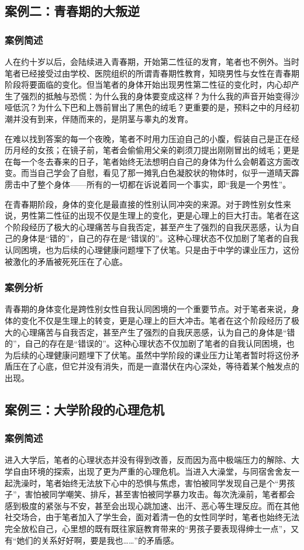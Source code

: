 \documentclass[twocolumn]{ctexart}
\begin{document}
\subsection {案例二：青春期的大叛逆}
\subsubsection{案例简述}
人在约十岁以后，会陆续进入青春期，开始第二性征的发育，笔者也不例外。当时笔者已经接受过由学校、医院组织的所谓青春期性教育，知晓男性与女性在青春期阶段将要面临的变化。但当笔者的身体开始出现男性第二性征的变化时，内心却产生了强烈的抵触与恐慌：为什么我的身体要变成这样？为什么我的声音开始变得沙哑低沉？为什么下巴和上唇前冒出了黑色的绒毛？更重要的是，预料之中的月经初潮并没有到来，伴随而来的，是阴茎与睾丸的发育。

在难以找到答案的每一个夜晚，笔者不时用力压迫自己的小腹，假装自己是正在经历月经的女孩；在镜子前，笔者会偷偷用父亲的剃须刀提出刚刚冒出的绒毛；更是在每一个冬去春来的日子，笔者始终无法想明白自己的身体为什么会朝着这方面改变。而当自己学会了自慰，看见了那一摊乳白色凝胶状的物体时，似乎一道晴天霹雳击中了整个身体——所有的一切都在诉说着同一个事实，即“我是一个男性”。

在青春期阶段，身体的变化是最直接的性别认同冲突的来源。对于跨性别女性来说，男性第二性征的出现不仅是生理上的变化，更是心理上的巨大打击。笔者在这个阶段经历了极大的心理痛苦与自我否定，甚至产生了强烈的自我厌恶感，认为自己的身体是“错的”，自己的存在是“错误的”。这种心理状态不仅加剧了笔者的自我认同困境，也为后续的心理健康问题埋下了伏笔。只是由于中学的课业压力，这份被激化的矛盾被死死压在了心底。

\subsubsection{案例分析}
青春期的身体变化是跨性别女性自我认同困境的一个重要节点。对于笔者来说，身体的变化不仅是生理上的转变，更是心理上的巨大冲击。笔者在这个阶段经历了极大的心理痛苦与自我否定，甚至产生了强烈的自我厌恶感，认为自己的身体是“错的”，自己的存在是“错误的”。这种心理状态不仅加剧了笔者的自我认同困境，也为后续的心理健康问题埋下了伏笔\cite{amnesty2019transmedical}。虽然中学阶段的课业压力让笔者暂时将这份矛盾压在了心底，但它并没有消失，而是一直潜伏在内心深处，等待着某个触发点的出现。

\subsection {案例三：大学阶段的心理危机}
\subsubsection{案例简述}
进入大学后，笔者的心理状态并没有得到改善，反而因为高中极端压力的解除、大学自由环境的探索，出现了更为严重的心理危机。当进入大澡堂，与同宿舍舍友一起洗澡时，笔者始终无法放下心中的恐惧与焦虑，害怕被同学发现自己是个“男孩子”，害怕被同学嘲笑、排斥，甚至害怕被同学暴力攻击。每次洗澡前，笔者都会感到极度的紧张与不安，甚至会出现心跳加速、出汗、恶心等生理反应。而在其他社交场合，由于笔者加入了学生会，面对着清一色的女性同学时，笔者也始终无法完全放松自己，心里想的既有既往家庭教育带来的“男孩子要表现得绅士一点”，又有“她们的关系好好啊，要是我也……”的矛盾感。
\end{document}
